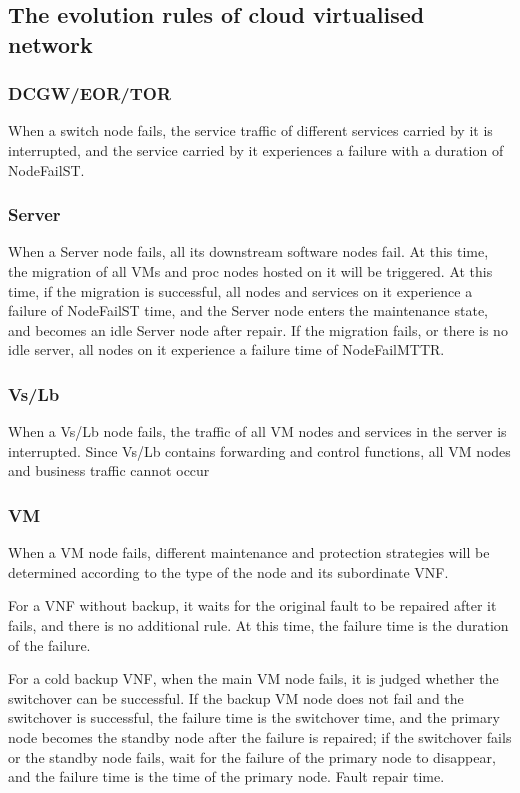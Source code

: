 \documentclass[journal]{IEEEtran}
\begin{document}
    \subsection{The evolution rules of cloud virtualised network}

    \subsubsection{DCGW/EOR/TOR}
    When a switch node fails, the service traffic of different services carried by it is interrupted, and the service carried by it experiences a failure with a duration of NodeFailST.

    \subsubsection{Server}
    When a Server node fails, all its downstream software nodes fail. At this time, the migration of all VMs and proc nodes hosted on it will be triggered. At this time, if the migration is successful, all nodes and services on it experience a failure of NodeFailST time, and the Server node enters the maintenance state, and becomes an idle Server node after repair. If the migration fails, or there is no idle server, all nodes on it experience a failure time of NodeFailMTTR.

    \subsubsection{Vs/Lb}
    When a Vs/Lb node fails, the traffic of all VM nodes and services in the server is interrupted. Since Vs/Lb contains forwarding and control functions, all VM nodes and business traffic cannot occur

    \subsubsection{VM}
    When a VM node fails, different maintenance and protection strategies will be determined according to the type of the node and its subordinate VNF.

    For a VNF without backup, it waits for the original fault to be repaired after it fails, and there is no additional rule. At this time, the failure time is the duration of the failure.

    For a cold backup VNF, when the main VM node fails, it is judged whether the switchover can be successful. If the backup VM node does not fail and the switchover is successful, the failure time is the switchover time, and the primary node becomes the standby node after the failure is repaired; if the switchover fails or the standby node fails, wait for the failure of the primary node to disappear, and the failure time is the time of the primary node. Fault repair time.
\end{document}
